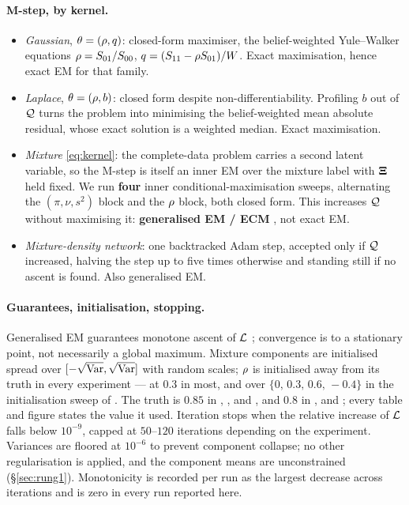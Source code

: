 \paragraph{M-step, by kernel.}
\begin{itemize}\itemsep2pt
\item \emph{Gaussian}, $\theta=(\rho,q)$: closed-form maximiser, the belief-weighted
      Yule--Walker equations $\rho = S_{01}/S_{00}$, $q = (S_{11}-\rho S_{01})/W$. Exact
      maximisation, hence exact EM for that family.
\item \emph{Laplace}, $\theta=(\rho,b)$: closed form despite non-differentiability. Profiling
      $b$ out of $\mathcal{Q}$ turns the problem into minimising the belief-weighted mean absolute
      residual, whose exact solution is a weighted median. Exact maximisation.
\item \emph{Mixture} \eqref{eq:kernel}: the complete-data problem carries a second latent
      variable, so the M-step is itself an inner EM over the mixture label with
      $\mathbf{\Xi}$ held fixed. We run \textbf{four} inner conditional-maximisation sweeps, alternating
      the $(\pi,\nu,s^2)$ block and the $\rho$ block, both closed form. This increases $\mathcal{Q}$
      without maximising it: \textbf{generalised EM / ECM} \citep{meng1993}, not exact EM.
\item \emph{Mixture-density network}: one backtracked Adam step, accepted only if $\mathcal{Q}$
      increased, halving the step up to five times otherwise and standing still if no ascent is
      found. Also generalised EM.
\end{itemize}

\paragraph{Guarantees, initialisation, stopping.} Generalised EM guarantees monotone ascent of
$\mathcal{L}$ \citep{dempster1977,wu1983}; convergence is to a stationary point, not necessarily a global
maximum. Mixture components are initialised spread over $[-\sqrt{\operatorname{Var}}, \sqrt{\operatorname{Var}}]$ with random
scales; $\rho$ is initialised away from its truth in every experiment --- at $0.3$ in most, and
over $\{0,\,0.3,\,0.6,\,-0.4\}$ in the initialisation sweep of . The truth is
$0.85$ in , ,  and , and
$0.8$ in ,  and ; every table and figure
states the value it used. Iteration
stops when the relative increase of $\mathcal{L}$ falls below $10^{-9}$, capped at $50$--$120$
iterations depending on the experiment. Variances are floored at $10^{-6}$ to prevent component
collapse; no other regularisation is applied, and the component means are unconstrained
(\S\ref{sec:rung1}). Monotonicity is recorded per run as the largest decrease across iterations and
is zero in every run reported here.

